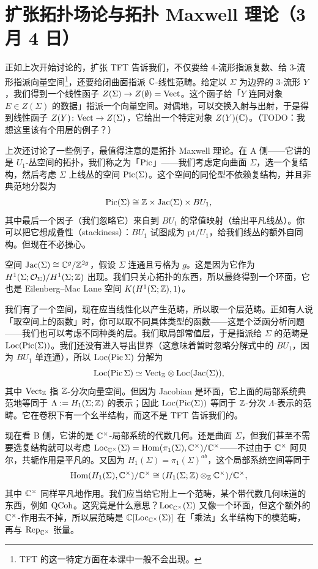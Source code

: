 \section[扩张 TFT 与拓扑 Maxwell 理论]{扩张拓扑场论与拓扑 Maxwell 理论（3 月 4 日）}


正如上次开始讨论的，扩张 TFT 告诉我们，不仅要给 4-流形指派复数、给 3-流形指派向量空间\footnote{TFT 的这一特定方面在本课中一般不会出现。}，还要给闭曲面指派 $\mathbb{C}$-线性范畴。给定以 $\Sigma$ 为边界的 3-流形 $Y$，我们得到一个线性函子 $Z(\Sigma)\to Z(\emptyset)=\mathrm{Vect}$。这个函子给「$Y$ 连同对象 $E\in Z(\Sigma)$ 的数据」指派一个向量空间。对偶地，可以交换入射与出射，于是得到线性函子 $Z(Y)\colon\mathrm{Vect}\to Z(\Sigma)$，它给出一个特定对象 $Z(Y)(\mathbb{C})$。（TODO：我想这里该有个用层的例子？）

上次还讨论了一些例子，最值得注意的是拓扑 Maxwell 理论。在 A 侧——它讲的是 $U_1$-丛空间的拓扑，我们称之为「$\operatorname{Pic}$」——我们考虑定向曲面 $\Sigma$，选一个复结构，然后考虑 $\Sigma$ 上线丛的空间 $\operatorname{Pic}(\Sigma)$。这个空间的同伦型不依赖复结构，并且非典范地分裂为
\[
  \operatorname{Pic}(\Sigma)\cong \mathbb{Z}\times \mathrm{Jac}(\Sigma)\times BU_1,
\]
其中最后一个因子（我们忽略它）来自到 $BU_1$ 的常值映射（给出平凡线丛）。你可以把它想成叠性（stackiness）：$BU_1$ 试图成为 $\mathrm{pt}/U_1$，给我们线丛的额外自同构。但现在不必操心。

空间 $\mathrm{Jac}(\Sigma)\cong\mathbb{C}^g/\mathbb{Z}^{2g}$，假设 $\Sigma$ 连通且亏格为 $g$。这是因为它作为 $H^1(\Sigma;\mathcal{O}_\Sigma)/H^1(\Sigma;\mathbb{Z})$ 出现。我们只关心拓扑的东西，所以最终得到一个环面，它也是 Eilenberg–Mac Lane 空间 $K(H^1(\Sigma;\mathbb{Z}),1)$。

我们有了一个空间，现在应当线性化以产生范畴，所以取一个层范畴。正如有人说「取空间上的函数」时，你可以取不同具体类型的函数——这是个泛函分析问题——我们也可以考虑不同种类的层。我们取局部常值层，于是指派给 $\Sigma$ 的范畴是 $\mathrm{Loc}(\operatorname{Pic}(\Sigma))$。我们还没有进入导出世界（这意味着暂时忽略分解式中的 $BU_1$，因为 $BU_1$ 单连通），所以 $\mathrm{Loc}(\operatorname{Pic}\Sigma)$ 分解为
\[
  \mathrm{Loc}(\operatorname{Pic}\Sigma)\simeq \mathrm{Vect}_{\mathbb{Z}}\otimes \mathrm{Loc}(\mathrm{Jac}(\Sigma)),
\]
其中 $\mathrm{Vect}_{\mathbb{Z}}$ 指 $\mathbb{Z}$-分次向量空间。但因为 Jacobian 是环面，它上面的局部系统典范地等同于 $\Lambda:=H_1(\Sigma;\mathbb{Z})$ 的表示；因此 $\mathrm{Loc}(\operatorname{Pic}(\Sigma))$ 等同于 $\mathbb{Z}$-分次 $\Lambda$-表示的范畴。它在卷积下有一个幺半结构，而这不是 TFT 告诉我们的。

现在看 B 侧，它讲的是 $\mathbb{C}^\times$-局部系统的代数几何。还是曲面 $\Sigma$，但我们甚至不需要选复结构就可以考虑 $\mathrm{Loc}_{\mathbb{C}^\times}(\Sigma)=\operatorname{Hom}(\pi_1(\Sigma),\mathbb{C}^\times)/\mathbb{C}^\times$——不过由于 $\mathbb{C}^\times$ 阿贝尔，共轭作用是平凡的。又因为 $H_1(\Sigma)=\pi_1(\Sigma)^{ab}$，这个局部系统空间等同于
\[
  \operatorname{Hom}(H_1(\Sigma),\mathbb{C}^\times)/\mathbb{C}^\times \cong (H_1(\Sigma;\mathbb{Z})\otimes_{\mathbb{Z}} \mathbb{C}^\times)/\mathbb{C}^\times,
\]
其中 $\mathbb{C}^\times$ 同样平凡地作用。我们应当给它附上一个范畴，某个带代数几何味道的东西，例如 $\mathrm{QCoh}$。这究竟是什么意思？$\mathrm{Loc}_{\mathbb{C}^\times}(\Sigma)$ 又像一个环面，但这个额外的 $\mathbb{C}^\times$-作用去不掉，所以层范畴是 $\mathbb{C}[\mathrm{Loc}_{\mathbb{C}^\times}(\Sigma)]$ 在「乘法」幺半结构下的模范畴，再与 $\operatorname{Rep}_{\mathbb{C}^\times}$ 张量。

